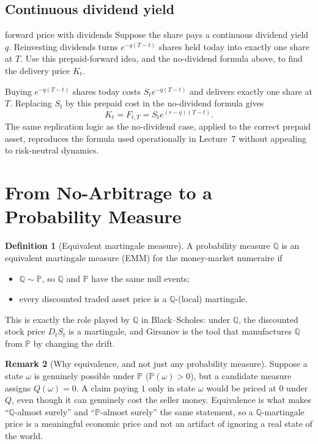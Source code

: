 \documentclass[10pt]{article}
\newcommand{\Pp}{\mathbb P}
\newcommand{\Q}{\mathbb Q}
\newcommand{\1}{\mathbf 1}
\theoremstyle{definition}
\newtheorem{definition}{Definition}[section]
\newtheorem{remark}[definition]{Remark}
\begin{document}
\subsection{Continuous dividend yield}

\begin{studentexercise}{forward price with dividends}
Suppose the share pays a continuous dividend yield \(q\). Reinvesting
dividends turns \(e^{-q(T-t)}\) shares held today into exactly one share at
\(T\). Use this prepaid-forward idea, and the no-dividend formula above, to
find the delivery price \(K_t\).
\end{studentexercise}
\begin{shortsolution}
Buying \(e^{-q(T-t)}\) shares today costs \(S_te^{-q(T-t)}\) and delivers
exactly one share at \(T\). Replacing \(S_t\) by this prepaid cost in the
no-dividend formula gives
\[
\boxed{K_t=F_{t,T}=S_te^{(r-q)(T-t)}.}
\]
The same replication logic as the no-dividend case, applied to the correct
prepaid asset, reproduces the formula used operationally in Lecture~7
without appealing to risk-neutral dynamics.
\end{shortsolution}

\section{From No-Arbitrage to a Probability Measure}

\begin{definition}[Equivalent martingale measure]
A probability measure \(\Q\) is an equivalent martingale measure (EMM) for
the money-market numeraire if
\begin{itemize}
  \item \(\Q\sim\Pp\), so \(\Q\) and \(\Pp\) have the same null events;
  \item every discounted traded asset price is a \(\Q\)-(local) martingale.
\end{itemize}
\end{definition}

This is exactly the role played by \(\Q\) in Black--Scholes: under \(\Q\),
the discounted stock price \(D_tS_t\) is a martingale, and Girsanov is the
tool that manufactures \(\Q\) from \(\Pp\) by changing the drift.

\begin{remark}[Why equivalence, and not just any probability measure]
Suppose a state \(\omega\) is genuinely possible under \(\Pp\)
(\(\Pp(\omega)>0\)), but a candidate measure assigns \(Q(\omega)=0\). A claim
paying \(1\) only in state \(\omega\) would be priced at \(0\) under \(Q\),
even though it can genuinely cost the seller money. Equivalence is what
makes ``\(\Q\)-almost surely'' and ``\(\Pp\)-almost surely'' the same
statement, so a \(\Q\)-martingale price is a meaningful economic price and
not an artifact of ignoring a real state of the world.
\end{remark}
\end{document}
